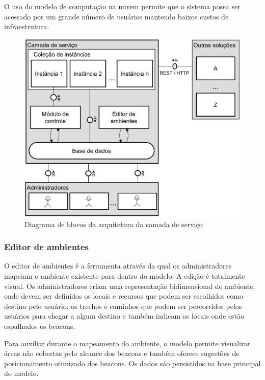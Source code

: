 \documentclass[english,brazilian]{UNISINOSmonografia}
\begin{document}
O uso do modelo de computação na nuvem permite que o sistema possa ser acessado por um grande número de usuários mantendo baixos custos de infraestrutura.

\FloatBarrier
\begin{figure}[!ht]
	\caption{Diagrama de blocos da arquitetura da camada de serviço}
	\label{fig:arquiteturaServico}
	\centering%
	\begin{minipage}{.7\textwidth}
		\includegraphics[width=\textwidth]{imgs/arquiteturaServico.png}
	\end{minipage}
\end{figure}
\FloatBarrier

	\subsubsection{Editor de ambientes}
O editor de ambientes é a ferramenta através da qual os administradores mapeiam o ambiente existente para dentro do modelo. A edição é totalmente visual. Os administradores criam uma representação bidimensional do ambiente, onde devem ser definidos os locais e recursos que podem ser escolhidos como destino pelo usuário, os trechos e caminhos que podem ser percorridos pelos usuários para chegar a algum destino e também indicam os locais onde estão espalhados os beacons.

Para auxiliar durante o mapeamento do ambiente, o modelo permite visualizar áreas não cobertas pelo alcance dos beacons e também oferece sugestões de posicionamento otimizado dos beacons. Os dados são persistidos na base principal do modelo.
\end{document}
